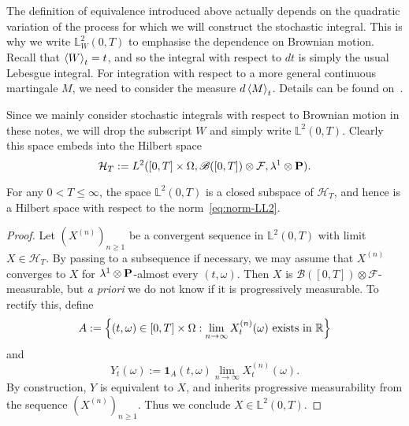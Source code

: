 \begin{remark}
\label{rmk:equivalence}
    The definition of equivalence introduced above actually depends on the quadratic variation of the process for which we will construct the stochastic integral. This is why we write $\mathbb{L}^2_W(0,T)$ to emphasise the dependence on Brownian motion. Recall that $\braket{W}_t=t$, and so the integral with respect to $dt$ is simply the usual Lebesgue integral. For integration with respect to a more general continuous martingale $M$, we need to consider the measure $d\braket{M}_t$. Details can be found on~\cite[p.\ 130]{KS}.
\end{remark}

Since we mainly consider stochastic integrals with respect to Brownian motion in these notes, we will drop the subscript $W$ and simply write $\mathbb{L}^2(0,T)$. Clearly this space embeds into the Hilbert space
\begin{equation*}
    \mathcal{H}_T := L^2([0,T]\times\Omega, \mathscr{B}([0,T])\otimes\mathcal{F}, \lambda^1\otimes\mathbf{P}).
\end{equation*}

\begin{lemma}
    For any $0<T\le\infty$, the space $\mathbb{L}^2(0,T)$ is a closed subspace of $\mathcal{H}_T$, and hence is a Hilbert space with respect to the norm~\eqref{eq:norm-LL2}.
\end{lemma}

\begin{proof}
    Let $(X^{(n)})_{n\ge 1}$ be a convergent sequence in $\mathbb{L}^2(0,T)$ with limit $X\in\mathcal{H}_T$. By passing to a subsequence if necessary, we may assume that $X^{(n)}$ converges to $X$ for $\lambda^1\otimes\mathbf{P}$-almost every $(t,\omega)$. Then $X$ is $\mathscr{B}([0,T])\otimes\mathcal{F}$-measurable, but \emph{a priori} we do not know if it is progressively measurable. To rectify this, define
    \begin{equation*}
        A := \left\{(t,\omega)\in [0,T]\times\Omega : \lim_{n\to\infty}X^{(n)}_t(\omega) \text{ exists in }\mathbb{R} \right\}
    \end{equation*}
    and
    \begin{equation*}
        Y_t(\omega) := \mathbf{1}_A(t,\omega)\lim_{n\to\infty}X^{(n)}_t(\omega).
    \end{equation*}
    By construction, $Y$ is equivalent to $X$, and inherits progressive measurability from the sequence $(X^{(n)})_{n\ge 1}$. Thus we conclude $X\in\mathbb{L}^2(0,T)$.
\end{proof}

